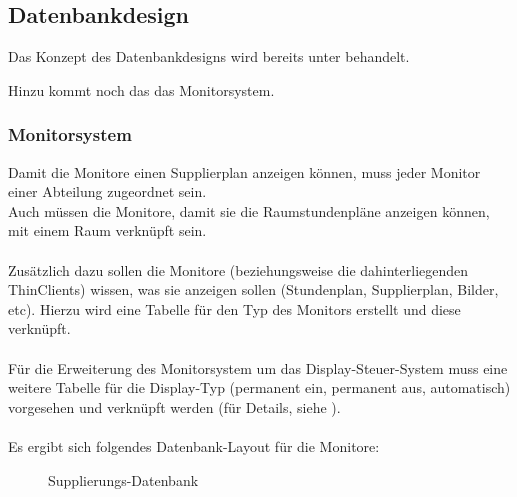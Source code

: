 \subsection{Datenbankdesign}

Das Konzept des Datenbankdesigns wird bereits unter  behandelt.

Hinzu kommt noch das das Monitorsystem.

\subsubsection{Monitorsystem}

Damit die Monitore einen Supplierplan anzeigen können, muss jeder Monitor einer Abteilung zugeordnet sein.\\
Auch müssen die Monitore, damit sie die Raumstundenpläne anzeigen können, mit einem Raum verknüpft sein.\\
\\
Zusätzlich dazu sollen die Monitore (beziehungsweise die dahinterliegenden ThinClients) wissen, was sie anzeigen sollen (Stundenplan, Supplierplan, Bilder, etc). Hierzu wird eine Tabelle für den Typ des Monitors erstellt und diese verknüpft.\\
\\ 
Für die Erweiterung des Monitorsystem um das Display-Steuer-System muss eine weitere Tabelle für die Display-Typ (permanent ein, permanent aus, automatisch) vorgesehen und verknüpft werden (für Details, siehe ).\\
\\
Es ergibt sich folgendes Datenbank-Layout für die Monitore:
\begin{figure}[H]
\centering
{}
\caption{Supplierungs-Datenbank}
\end{figure}
